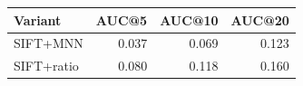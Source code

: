 \begin{tabular}{lrrr}
\toprule
Variant & AUC@5 & AUC@10 & AUC@20 \\
\midrule
SIFT+MNN & 0.037 & 0.069 & 0.123 \\
SIFT+ratio & 0.080 & 0.118 & 0.160 \\
\bottomrule
\end{tabular}